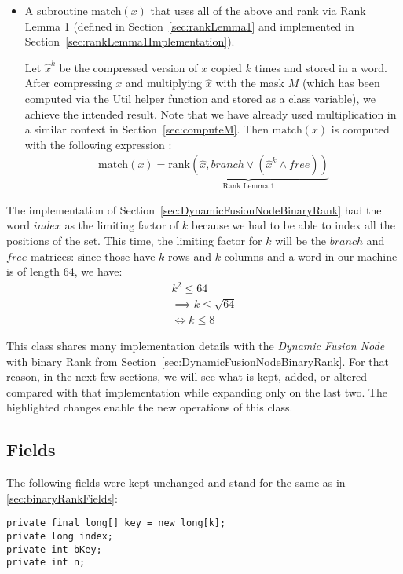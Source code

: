 \begin{itemize}
    \item
    A subroutine $\text{match}(x)$ that uses all of the above and rank via Rank Lemma 1 (defined in Section~\ref{sec:rankLemma1} and implemented in Section~\ref{sec:rankLemma1Implementation}).
    
    Let $\hat x^k$ be the compressed version of $x$ copied $k$ times and stored in a word. After compressing $x$ and multiplying $\hat x$ with the mask $M$ (which has been computed via the {\ttfamily Util} helper function and stored as a class variable), we achieve the intended result. Note that we have already used multiplication in a similar context in Section~\ref{sec:computeM}.
    Then $\text{match}(x)$ is computed with the following expression \cite{patrascu2014dynamic}:
    \begin{align*}
        \text{match}(x) = \underbrace{\text{rank}(\hat x, branch \vee (\hat x^k \wedge free))}_{\text{Rank Lemma 1}}
    \end{align*}
\end{itemize}

The implementation of Section~\ref{sec:DynamicFusionNodeBinaryRank} had the word $index$ as the limiting factor of $k$ because we had to be able to index all the positions of the set. This time, the limiting factor for $k$ will be the $branch$ and $free$ matrices: since those have $k$ rows and $k$ columns and a word in our machine is of length 64, we have:
\begin{align*}
    k^2 \leq 64\\
    \implies k \leq \sqrt{64}\\
    \iff k \leq 8
\end{align*}

This class shares many implementation details with the \textit{Dynamic Fusion Node} with binary Rank from Section~\ref{sec:DynamicFusionNodeBinaryRank}. For that reason, in the next few sections, we will see what is kept, added, or altered compared with that implementation while expanding only on the last two. The highlighted changes enable the new operations of this class.

\subsection{Fields} \label{sec:dontCaresRankFields}
The following fields were kept unchanged and stand for the same as in \ref{sec:binaryRankFields}:
\begin{lstlisting}
private final long[] key = new long[k];
private long index;
private int bKey;
private int n;
\end{lstlisting}

